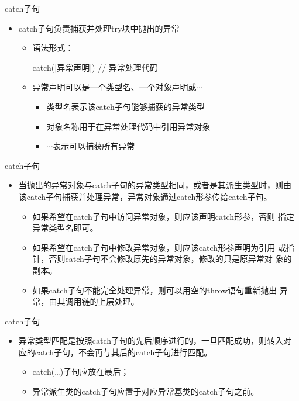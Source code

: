\begin{frame}[t, fragile]{catch子句}%
  \begin{itemize}
  \item catch子句负责捕获并处理try块中抛出的异常
    \begin{itemize}
    \item 语法形式：\\
      \begin{cpptt}
        catch(|异常声明|)
        {
          // 异常处理代码
        }
      \end{cpptt}
    \item 异常声明可以是一个类型名、一个对象声明或$\cdots$
      \begin{itemize}
      \item 类型名表示该catch子句能够捕获的异常类型
      \item 对象名称用于在异常处理代码中引用异常对象
      \item $\cdots$表示可以捕获所有异常
      \end{itemize}
    \end{itemize}
  \end{itemize}
\end{frame}

\begin{frame}[t, fragile]{catch子句}%
  \begin{itemize}
  \item 当抛出的异常对象与catch子句的异常类型相同，或者是其派生类型时，则由该catch子句捕获并处理异常，异常对象通过catch形参传给catch子句。
    \begin{itemize}
    \item 如果希望在catch子句中访问异常对象，则应该声明catch形参，否则
      指定异常类型名即可。
    \item 如果希望在catch子句中修改异常对象，则应该catch形参声明为\alert{引用
      或指针}，否则catch子句不会修改原先的异常对象，修改的只是原异常对
      象的副本。
    \item 如果catch子句不能完全处理异常，则可以用空的throw语句\alert{重新抛出
      异常}，由其调用链的上层处理。
    \end{itemize}
  \end{itemize}
\end{frame}

\begin{frame}[t, fragile]{catch子句}%
  \begin{itemize}
  \item 异常类型匹配是按照catch子句的先后顺序进行的，一旦匹配成功，则转入对应的catch子句，不会再与其后的catch子句进行匹配。
    \begin{itemize}
    \item catch(…)子句应放在最后；
    \item 异常派生类的catch子句应置于对应异常基类的catch子句之前。
    \end{itemize}
  \end{itemize}
\end{frame}

